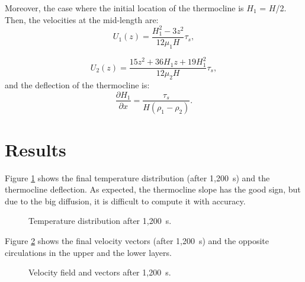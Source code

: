 Moreover, the case where the initial location of the thermocline is
$H_1$ = $H$/2. 
Then, the velocities at the mid-length are:
\begin{equation}
U_1(z) = \dfrac{H_1^2- 3 z^2}{12 \mu_1 H} \tau_s ,
\end{equation}

\begin{equation}
U_2(z) = \dfrac{15 z^2 + 36  H_1 z + 19 H_1^2}{12 \mu_2 H}\tau_s ,
\end{equation}
and the deflection of the thermocline is:
\begin{equation}
\frac{\partial H_1 }{\partial x} = \frac{\tau_s}{H(\rho_1-\rho_2)} .
\end{equation}


\section{Results}

Figure \ref{fig:stratif_wind:temp:section} shows the final temperature
distribution (after 1,200~s) and the thermocline deflection.
As expected, the thermocline slope has the good sign, but due to the big
diffusion, it is difficult to compute it with accuracy.

\begin{figure}[H]
 \centering
  \caption{Temperature distribution after 1,200~s.}\label{fig:stratif_wind:temp:section}
\end{figure}

Figure \ref{fig:stratif_wind:velo_vectors:section} shows the final velocity
vectors (after 1,200~s) and the opposite circulations in the upper and the lower
layers.

\begin{figure}[H]
 \centering
\caption{Velocity field and vectors after 1,200~s.}\label{fig:stratif_wind:velo_vectors:section}
\end{figure}



